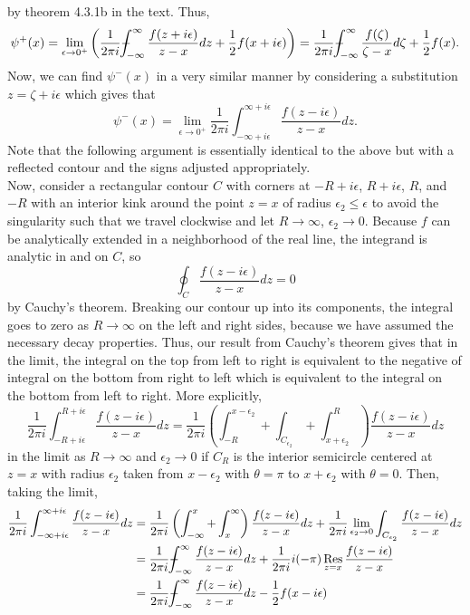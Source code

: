 \documentclass{article}
\begin{document}
by theorem 4.3.1b in the text. Thus, 
\[
\psi^+(x)=\lim_{\epsilon\to0^+}\left(\frac{1}{2\pi i}\pvint_{-\infty}^{\infty}\frac{f(z+i\epsilon)}{z-x}dz+\frac{1}{2}f(x+i\epsilon)\right)=\frac{1}{2\pi i}\pvint_{-\infty}^{\infty}\frac{f(\zeta)}{\zeta-x}d\zeta+\frac{1}{2}f(x).
\]
Now, we can find $\psi^-(x)$ in a very similar manner by considering a substitution $z=\zeta+i\epsilon$ 
which gives that 
\[
\psi^-(x)=\lim_{\epsilon\to0^+}\frac{1}{2\pi i}\int_{-\infty+i\epsilon}^{\infty+i\epsilon}\frac{f(z-i\epsilon)}{z-x}dz.
\]
Note that the following argument is essentially identical to the above but with a reflected contour and the signs adjusted appropriately. \\ 
Now, consider a rectangular contour $C$ with corners at $-R+i\epsilon$, $R+i\epsilon$, $R$, and $-R$ with an interior kink around the point $z=x$ of radius $\epsilon_2\leq\epsilon$ to avoid the singularity such that we travel clockwise and let $R\to\infty$, $\epsilon_2\to0$. Because $f$ can be analytically extended in a neighborhood of the real line, the integrand is analytic in and on $C$, so \[
\oint_C\frac{f(z-i\epsilon)}{z-x}dz=0 
\]
by Cauchy's theorem. Breaking our contour up into its components, the integral goes to zero as $R\to\infty$ on the left and right sides, because we have assumed the necessary decay properties. Thus, our result from Cauchy's theorem gives that in the limit, the integral on the top from left to right is equivalent to the negative of integral on the bottom from right to left which is equivalent to the integral on the bottom from left to right. More explicitly,
\[
\frac{1}{2\pi i}\int_{-R+i\epsilon}^{R+i\epsilon}\frac{f(z-i\epsilon)}{z-x}dz=\frac{1}{2\pi i}\left(\int_{-R}^{x-\epsilon_2}+\int_{C_{\epsilon_2}}+\int_{x+\epsilon_2}^R\right)\frac{f(z-i\epsilon)}{z-x}dz
\]
in the limit as $R\to\infty$ and $\epsilon_2\to0$ if $C_R$ is the interior semicircle centered at $z=x$ with radius $\epsilon_2$ taken from $x-\epsilon_2$ with $\theta=\pi$ to $x+\epsilon_2$ with $\theta=0$.
Then, taking the limit,
\begin{align*}
\frac{1}{2\pi i}\int_{-\infty+i\epsilon}^{\infty+i\epsilon}\frac{f(z-i\epsilon)}{z-x}dz&=\frac{1}{2\pi i}\left(\int_{-\infty}^{x}+\int_{x}^\infty\right)\frac{f(z-i\epsilon)}{z-x}dz+\frac{1}{2\pi i}\lim_{\epsilon_2\to0}\int_{C_{\epsilon_2}}\frac{f(z-i\epsilon)}{z-x}dz\\&=
\frac{1}{2\pi i}\pvint_{-\infty}^{\infty}\frac{f(z-i\epsilon)}{z-x}dz+\frac{1}{2\pi i}i(-\pi)\Res_{z=x}\frac{f(z-i\epsilon)}{z-x}\\&=
\frac{1}{2\pi i}\pvint_{-\infty}^{\infty}\frac{f(z-i\epsilon)}{z-x}dz-\frac{1}{2}f(x-i\epsilon)
\end{align*}
\end{document}
